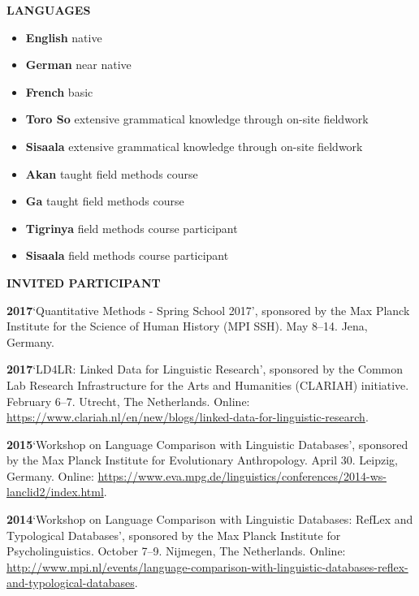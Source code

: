 \documentclass[11pt]{article}
\newcommand{\hangpara}{
 \setlength{\parindent}{0in} %
 \hangindent=0.42in %
}
\begin{document}
\vskip 10pt
\begin{flushleft}
{\bf LANGUAGES}
\end{flushleft}
\begin{itemize}
\item {\bf English} native
\item {\bf German} near native %
\item {\bf French} basic
\item {\bf Toro So} extensive grammatical knowledge through on-site fieldwork
\item {\bf Sisaala} extensive grammatical knowledge through on-site fieldwork
\item {\bf Akan} taught field methods course
\item {\bf Ga} taught field methods course
\item {\bf Tigrinya} field methods course participant
\item {\bf Sisaala} field methods course participant
\end{itemize}


\vskip 10pt
\begin{flushleft}
{\bf INVITED PARTICIPANT}
\end{flushleft}

\hangpara
{\bf 2017}\hspace{1ex}`Quantitative Methods - Spring School 2017', sponsored by the Max Planck Institute for the Science of Human History (MPI SSH). May 8--14. Jena, Germany.

\hangpara
\vskip 6pt
{\bf 2017}\hspace{1ex}`LD4LR: Linked Data for Linguistic Research', sponsored by the Common Lab Research Infrastructure for the Arts and Humanities (CLARIAH) initiative. February 6--7. Utrecht, The Netherlands. Online: \url{https://www.clariah.nl/en/new/blogs/linked-data-for-linguistic-research}.

\hangpara
\vskip 6pt
{\bf 2015}\hspace{1ex}`Workshop on Language Comparison with Linguistic Databases', sponsored by the Max Planck Institute for Evolutionary Anthropology. April 30. Leipzig, Germany. Online: \url{https://www.eva.mpg.de/linguistics/conferences/2014-ws-lanclid2/index.html}.

\hangpara
\vskip 6pt
{\bf 2014}\hspace{1ex}`Workshop on Language Comparison with Linguistic Databases: RefLex and Typological Databases', sponsored by the Max Planck Institute for Psycholinguistics. October 7--9. Nijmegen, The Netherlands. Online: \url{http://www.mpi.nl/events/language-comparison-with-linguistic-databases-reflex-and-typological-databases}.
\end{document}
